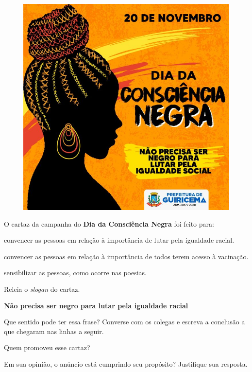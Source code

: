 \begin{figure}[htpb!]
\centering
\includegraphics[width=.6\textwidth]{media/image14.jpeg}
\end{figure}

\pagebreak

\begin{escolha}
\item O cartaz da campanha do \textbf{Dia da Consciência Negra} foi feito para:

\begin{boxlist}
 convencer as pessoas em relação à importância de lutar pela igualdade racial.

 convencer as pessoas em relação à importância de todos terem acesso à vacinação.

 sensibilizar as pessoas, como ocorre nas poesias.
\end{boxlist}

\item Releia o \emph{slogan} do cartaz.

\begin{mdframed}[linewidth=10pt,linecolor=salmao!20,backgroundcolor=salmao!20,roundcorner=20pt]
\textbf{Não precisa ser negro para lutar pela igualdade racial}
\end{mdframed}

Que sentido pode ter essa frase? Converse com os colegas e escreva a
conclusão a que chegaram nas linhas a seguir.


\item Quem promoveu esse cartaz?


\item Em sua opinião, o anúncio está cumprindo seu propósito? Justifique 
sua resposta.

\end{escolha}

